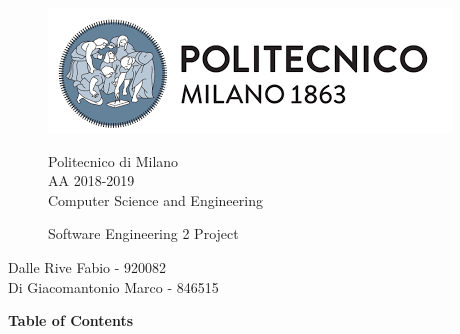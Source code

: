 \documentclass{article}
\begin{document}
\begin{figure}[t!]
	\includegraphics[width= \linewidth]{PolimiLogo.png}
	\begin{center}
	Politecnico di Milano\\[4pt]
	AA 2018-2019  \\[4pt]
	Computer Science and Engineering \\[4pt]
	\begin{large}
	Software Engineering 2 Project
	\end{large}
	\end{center}
\end{figure}
\begin{flushright}
\begin{large}
Dalle Rive Fabio - 920082 \\[4pt]
Di Giacomantonio Marco - 846515 \\[4pt]
\end{large}
\end{flushright}
\newpage
{\Large\textbf{Table of Contents}}
\end{document}
